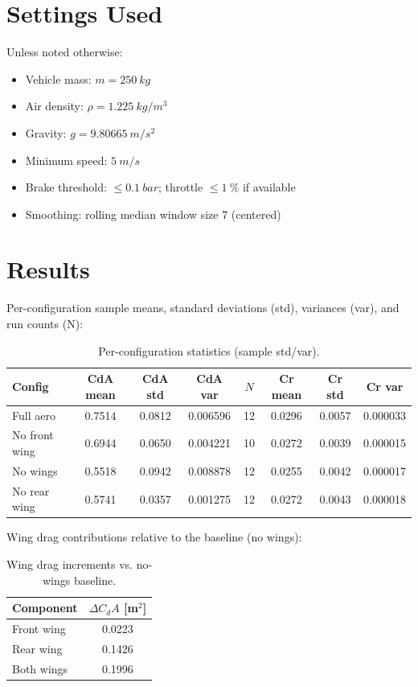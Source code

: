 \documentclass[11pt,a4paper]{article}
\begin{document}
\section{Settings Used\label{sec:settings}}
Unless noted otherwise:
\begin{itemize}
  \item Vehicle mass: \(m=\SI{250}{kg}\)
  \item Air density: \(\rho=\SI{1.225}{kg/m^3}\)
  \item Gravity: \(g=\SI{9.80665}{m/s^2}\)
  \item Minimum speed: \(\SI{5}{m/s}\)
  \item Brake threshold: \(\leq\SI{0.1}{bar}\); throttle \(\leq\SI{1}{\%}\) if available
  \item Smoothing: rolling median window size 7 (centered)
\end{itemize}

\section{Results\label{sec:results}}
Per-configuration sample means, standard deviations (std), variances (var), and run counts (N):
\begin{table}[h]
  \centering
  \begin{tabular}{l S[table-format=1.4] S[table-format=1.4] S[table-format=1.6] c S[table-format=1.4] S[table-format=1.4] S[table-format=1.6]}
    \toprule
    {Config} & {CdA mean} & {CdA std} & {CdA var} & {$N$} & {Cr mean} & {Cr std} & {Cr var} \\
    \midrule
    Full aero        & 0.7514 & 0.0812 & 0.006596 & 12 & 0.0296 & 0.0057 & 0.000033 \\
    No front wing    & 0.6944 & 0.0650 & 0.004221 & 10 & 0.0272 & 0.0039 & 0.000015 \\
    No wings         & 0.5518 & 0.0942 & 0.008878 & 12 & 0.0255 & 0.0042 & 0.000017 \\
    No rear wing     & 0.5741 & 0.0357 & 0.001275 & 12 & 0.0272 & 0.0043 & 0.000018 \\
    \bottomrule
  \end{tabular}
  \caption{Per-configuration statistics (sample std/var).}
\end{table}

Wing drag contributions relative to the baseline (no wings):
\begin{table}[h]
  \centering
  \begin{tabular}{l S[table-format=1.4]}
    \toprule
    {Component} & {\(\Delta C_dA\) [m$^2$]} \\
    \midrule
    Front wing  & 0.0223 \\
    Rear wing   & 0.1426 \\
    Both wings  & 0.1996 \\
    \bottomrule
  \end{tabular}
  \caption{Wing drag increments vs. no-wings baseline.}
\end{table}
\end{document}
